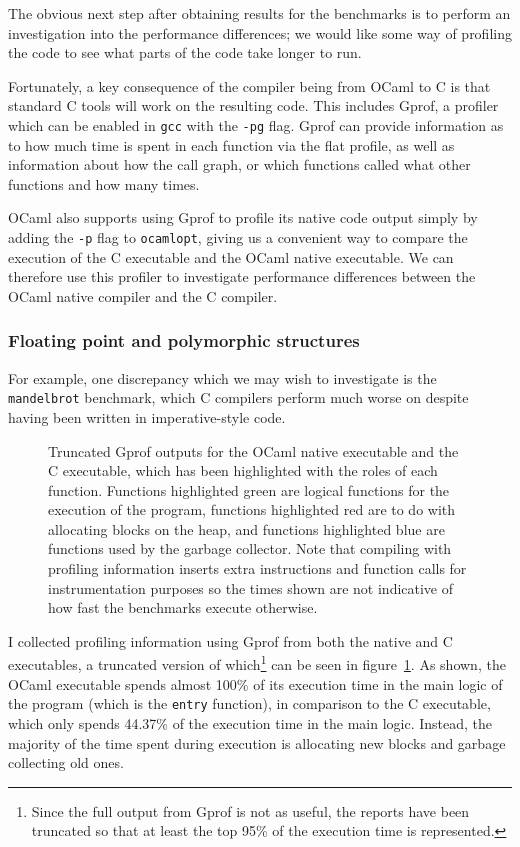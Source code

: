 The obvious next step after obtaining results for the benchmarks is to perform
an investigation into the performance differences; we would like some way of
profiling the code to see what parts of the code take longer to run.

Fortunately, a key consequence of the compiler being from OCaml to C is that
standard C tools will work on the resulting code. This includes Gprof, a
profiler which can be enabled in \texttt{gcc} with the \texttt{-pg} flag. Gprof
can provide information as to how much time is spent in each function via the
flat profile, as well as information about how the call graph, or which
functions called what other functions and how many times.

OCaml also supports using Gprof to profile its native code output simply by
adding the \texttt{-p} flag to \texttt{ocamlopt}, giving us a convenient way to
compare the execution of the C executable and the OCaml native executable. We
can therefore use this profiler to investigate performance differences between
the OCaml native compiler and the C compiler.

\subsubsection{Floating point and polymorphic structures} \label{float-alloc}

For example, one discrepancy which we may wish to investigate is the 
\texttt{mandelbrot} benchmark, which C compilers perform much worse on despite 
having been written in imperative-style code.

\begin{figure}
    \centering
    
    \caption{Truncated Gprof outputs for the OCaml native executable and the C 
    executable, which has been highlighted with the roles of each function. 
    Functions highlighted green are logical functions for the execution of the 
    program, functions highlighted red are to do with allocating blocks on the 
    heap, and functions highlighted blue are functions used by the garbage 
    collector.
    Note that compiling with profiling information inserts extra instructions 
    and function calls for instrumentation purposes so the times shown are not 
    indicative of how fast the benchmarks execute otherwise.}
    \label{fig:mandelbrot-gprof}
\end{figure}

I collected profiling information using Gprof from both the native and C
executables, a truncated version of which\footnote{Since the full output from
Gprof is not as useful, the reports have been truncated so that at least the top
95\% of the execution time is represented.} can be seen in
figure~\ref{fig:mandelbrot-gprof}. As shown, the OCaml executable spends almost
100\% of its execution time in the main logic of the program (which is the
\texttt{entry} function), in comparison to the C executable, which only spends
44.37\% of the execution time in the main logic. Instead, the majority of the
time spent during execution is allocating new blocks and garbage collecting old
ones.

